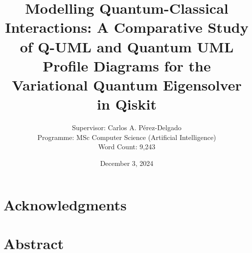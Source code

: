 \documentclass{article}
\title{Modelling Quantum-Classical Interactions: A Comparative Study of Q-UML and Quantum UML Profile Diagrams for the Variational Quantum Eigensolver in Qiskit}
\author{Supervisor: Carlos A. Pérez-Delgado\\ Programme: MSc Computer Science (Artificial Intelligence) \\ Word Count: 9,243}
\date{December 3, 2024}
\begin{document}
\maketitle

\thispagestyle{empty} %

\newpage
\setcounter{page}{1}

\section*{Acknowledgments}
\newpage

\section*{Abstract}
\newpage

\listoffigures
\newpage

\listoftables
\newpage

\end{document}
